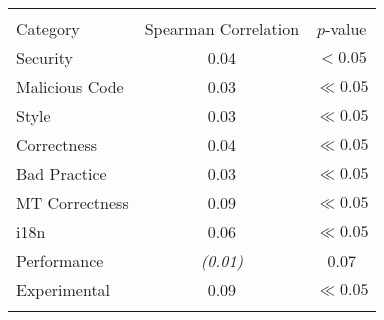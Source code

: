 
\begin{tabular}{lcc}
\hline \\
Category & Spearman Correlation & $p$-value \\ \hline 
Security & 0.04 & $< 0.05$\\
Malicious Code & 0.03 & $\ll 0.05$\\
Style & 0.03 & $\ll 0.05$\\
Correctness & 0.04 & $\ll 0.05$\\
Bad Practice & 0.03 & $\ll 0.05$\\
MT Correctness & 0.09 & $\ll 0.05$\\
i18n & 0.06 & $\ll 0.05$\\
Performance & {\it (0.01) } & 0.07\\
Experimental & 0.09 & $\ll 0.05$\\
\hline \\
\end{tabular}
